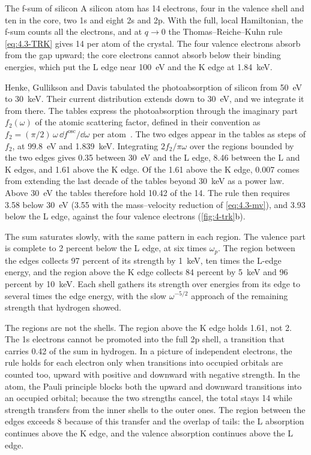 \begin{workedexample}{The f-sum of silicon}\label{we:4-sifsum}
A silicon atom has 14 electrons, four in the valence shell and ten in the core, two 1s and eight 2s and 2p. With the full, local Hamiltonian, the f-sum counts all the electrons, and at $q \to 0$ the Thomas--Reiche--Kuhn rule \cref{eq:4.3-TRK} gives 14 per atom of the crystal. The four valence electrons absorb from the gap upward; the core electrons cannot absorb below their binding energies, which put the L edge near \SI{100}{eV} and the K edge at \SI{1.84}{keV}.

Henke, Gullikson and Davis tabulated the photoabsorption of silicon from \SI{50}{eV} to \SI{30}{keV}. Their current distribution extends down to \SI{30}{eV}, and we integrate it from there. The tables express the photoabsorption through the imaginary part $f_2(\omega)$ of the atomic scattering factor, defined in their convention as $f_2 = (\pi/2)\,\omega\,\dd f^{\mathrm{osc}}/\dd\omega$ per atom~\cite{henke1993xray}. The two edges appear in the tables as steps of $f_2$, at \SI{99.8}{eV} and \SI{1.839}{keV}. Integrating $2f_2/\pi\omega$ over the regions bounded by the two edges gives 0.35 between \SI{30}{eV} and the L edge, 8.46 between the L and K edges, and 1.61 above the K edge. Of the 1.61 above the K edge, 0.007 comes from extending the last decade of the tables beyond \SI{30}{keV} as a power law. Above \SI{30}{eV} the tables therefore hold 10.42 of the 14. The rule then requires 3.58 below \SI{30}{eV} (3.55 with the mass--velocity reduction of \cref{eq:4.3-mv}), and 3.93 below the L edge, against the four valence electrons (\cref{fig:4-trk}b).

The sum saturates slowly, with the same pattern in each region. The valence part is complete to 2 percent below the L edge, at six times $\omega_p$. The region between the edges collects 97 percent of its strength by \SI{1}{keV}, ten times the L-edge energy, and the region above the K edge collects 84 percent by \SI{5}{keV} and 96 percent by \SI{10}{keV}. Each shell gathers its strength over energies from its edge to several times the edge energy, with the slow $\omega^{-5/2}$ approach of the remaining strength that hydrogen showed.

The regions are not the shells. The region above the K edge holds 1.61, not 2. The 1s electrons cannot be promoted into the full 2p shell, a transition that carries 0.42 of the sum in hydrogen. In a picture of independent electrons, the rule holds for each electron only when transitions into occupied orbitals are counted too, upward with positive and downward with negative strength. In the atom, the Pauli principle blocks both the upward and downward transitions into an occupied orbital; because the two strengths cancel, the total stays 14 while strength transfers from the inner shells to the outer ones. The region between the edges exceeds 8 because of this transfer and the overlap of tails: the L absorption continues above the K edge, and the valence absorption continues above the L edge.


\end{workedexample}
